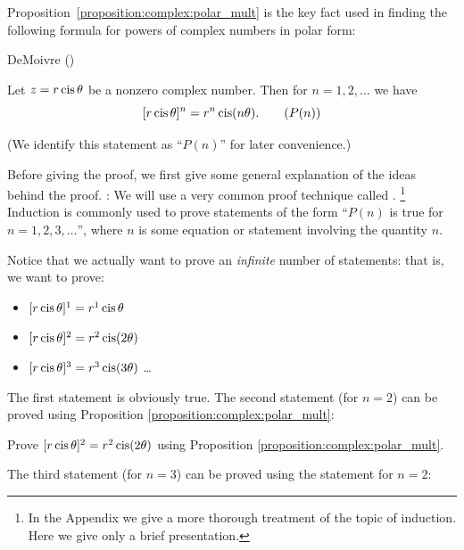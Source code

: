 {\begin{exercise}{26}
\begin{multicols}{2}
\begin{enumerate}[(a)]
\end{enumerate}
\end{multicols}
\end{exercise}

\noindent
Proposition~\ref{proposition:complex:polar_mult} is the key fact used in finding the following formula for powers of complex numbers in polar form:

\begin{prop}{DeMoivre} ()

Let $z=r\operatorname{cis}\theta$ be a nonzero complex number. Then for $n=1,2,\ldots$ we have
\[ [r\operatorname{cis}\theta]^{n}=r^{n}\operatorname{cis}(n\theta).\tag{$P(n)$}\]
 \end{prop}
(We identify this statement as ``$P(n)$'' for later convenience.)

 Before giving the proof, we first give some general explanation of the ideas behind the proof.
\bigskip
\newline
{}:  We will use a very common proof technique called .
\footnote{In the Appendix we give a more thorough treatment of the topic of induction. Here we give only a brief presentation.}
 Induction is commonly used to prove statements of the form ``$P(n)$ is true for $n = 1,2,3,\ldots$'', where $n$ is some equation or statement involving the quantity $n$. 

Notice that we actually want to prove an \emph{infinite} number of statements: that is, we want to prove:
\begin{itemize}
\item 
$[r\operatorname{cis}\theta]^{1}=r^{1}\operatorname{cis}\theta$
\item
$[r\operatorname{cis}\theta]^{2}=r^{2}\operatorname{cis}(2\theta)$
\item
$[r\operatorname{cis}\theta]^{3}=r^{3}\operatorname{cis}(3\theta)$
\ldots
\end{itemize}

\noindent The first statement is obviously true. The second statement (for $n=2$) can be proved using Proposition
\ref{proposition:complex:polar_mult}:

\begin{exercise}{27} Prove $[r\operatorname{cis}\theta]^{2}=r^{2}\operatorname{cis}(2\theta)$ using Proposition
\ref{proposition:complex:polar_mult}.
\end{exercise}

The third statement (for $n=3$) can be proved using the statement for $n=2$:

}
